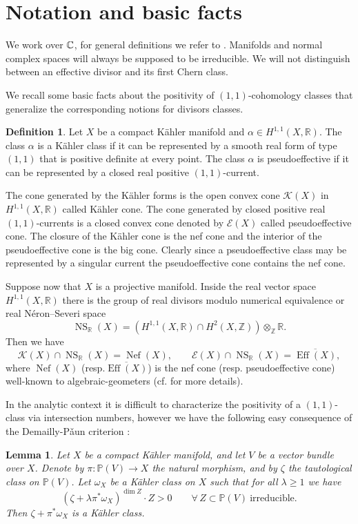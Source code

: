 \documentclass[11pt]{article}
\newcommand{\cf}{cf.\xspace}
\newcommand{\resp}{resp.\xspace}
\let\mathcal\mathscr
\theoremstyle{plain}
\newtheorem{lemma}[theorem]{Lemma}
\theoremstyle{definition}
\newtheorem{definition}[theorem]{Definition}
\newcommand{\R}{\ensuremath{\mathbb{R}}}
\newcommand{\Z}{\ensuremath{\mathbb{Z}}}
\newcommand{\PP}{\ensuremath{\mathbb{P}}}
\newcommand{\holom}[3]{\ensuremath{#1:#2\to #3}}
\DeclareMathOperator{\Eff}{Eff}
\DeclareMathOperator{\Nef}{Nef}
\DeclareMathOperator{\NS}{NS}
\begin{document}
\section{Notation and basic facts}

We work over $\mathbb{C}$, for general definitions we refer to \cite{Har77, Dem12}.
Manifolds and normal complex spaces will always be supposed to be irreducible.
We will not distinguish between an effective divisor and its first Chern class.

We recall some basic facts about the positivity of $(1,1)$-cohomology classes that generalize
the corresponding notions for divisors classes.

\begin{definition}
Let $X$ be a compact Kähler manifold and $\alpha\in H^{1,1}(X, \R)$. The class $\alpha$ is a Kähler class if it can be represented by a smooth real form of type $(1,1)$ that is positive definite at every point. The class $\alpha$ is pseudoeffective if it can be represented by a closed real positive $(1,1)$-current.
\end{definition}

The cone generated by the Kähler forms is the open convex cone $\mathcal{K}(X)$ in $H^{1,1}(X, \R)$ called Kähler cone. The cone generated by closed positive real $(1,1)$-currents is a closed convex cone denoted by $\mathcal{E}(X)$ called pseudoeffective cone. The closure of the Kähler cone is the nef cone and the interior of the pseudoeffective cone is the big cone. Clearly since a pseudoeffective class may be represented by a singular current the pseudoeffective cone contains the nef cone.

Suppose now that $X$ is a projective manifold. Inside the real vector space $H^{1,1}(X, \R)$ there is the group of real divisors modulo numerical equivalence or real Néron--Severi space
\[
\NS_\R(X)=\left( H^{1,1}(X, \R)\cap H^2(X,\Z) \right)\otimes_\Z \R.
\]
Then we have
\[
\mathcal{K}(X)\cap \NS_\R(X) = \Nef(X),
\qquad
\mathcal{E}(X)\cap \NS_\R(X) = \overline{\Eff(X)},
\]
where $\Nef(X)$ (\resp $\overline{\Eff(X)}$) is the nef cone (\resp pseudoeffective
cone) well-known to algebraic-geometers (\cf \cite{BDPP13} for more details).

In the analytic context it is difficult to characterize the positivity of a $(1,1)$-class via intersection numbers,
however we have the following easy consequence of the Demailly-P\v aun criterion \cite[Th.\,0.1]{DP04}:

\begin{lemma} \label{lemmaconnected}
Let $X$ be a compact Kähler manifold, and let $V$ be a vector bundle over $X$.
Denote by $\holom{\pi}{\PP(V)}{X}$ the natural morphism, and by
$\zeta$ the tautological class on $\PP(V)$. Let $\omega_X$ be a Kähler class on $X$ such that
for all $\lambda \geq 1$ we have
\[
(\zeta+ \lambda \pi^* \omega_X)^{\dim Z} \cdot Z >0 \qquad \forall\,Z \subset \PP(V) \ \mbox{irreducible}.
\]
Then $\zeta+ \pi^* \omega_X$ is a Kähler class.
\end{lemma}
\end{document}

